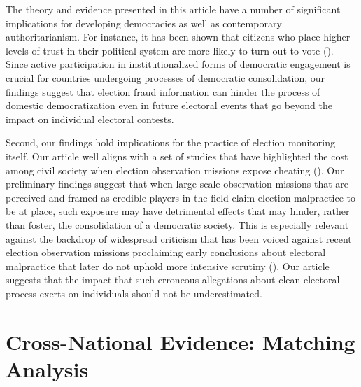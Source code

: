 \documentclass[11pt, ngerman,english,a4]{article}
\begin{document}
The theory and evidence presented in this article have a number of significant implications for developing democracies as well as contemporary authoritarianism. For instance, it has been shown that citizens who place higher levels of trust in their political system are more likely to turn out to vote (\citealt{WANG2016291}). Since active participation in institutionalized forms of democratic engagement is crucial for countries undergoing processes of democratic consolidation, our findings suggest that election fraud information can hinder the process of domestic democratization even in future electoral events that go beyond the impact on individual electoral contests. 

Second, our findings hold implications for the practice of election monitoring itself. Our article well aligns with a set of studies that have highlighted the cost among civil society when election observation missions expose cheating (\citealt{Daxecker2012}). Our preliminary findings suggest that when large-scale observation missions that are perceived and framed as credible players in the field claim election malpractice to be at place, such exposure may have detrimental effects that may hinder, rather than foster, the consolidation of a democratic society. This is especially relevant against the backdrop of widespread criticism that has been voiced against recent election observation missions proclaiming early conclusions about electoral malpractice that later do not uphold more intensive scrutiny (\citealt{Idrobo2020}). Our article suggests that the impact that such erroneous allegations about clean electoral process exerts on individuals should not be underestimated. 

\singlespace
 


\newpage
\appendix
\thispagestyle{empty}
\appendixpage
\startcontents[sections]
\newpage
\renewcommand*{\thepage}{A\arabic{page}}
\renewcommand*{\thesection}{\Alph{section}.}
\renewcommand*{\thesubsection}{\alph{subsection}.}
\renewcommand\thefigure{A\arabic{figure}}   
\renewcommand\thetable{A\arabic{table}}  
\setcounter{figure}{0}
\setcounter{table}{0}
\setcounter{page}{1}





\section{Cross-National Evidence: Matching Analysis}
\end{document}

